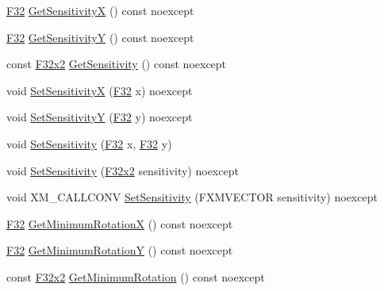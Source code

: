 \begin{DoxyCompactItemize}
\item 
\hyperlink{namespacemage_aa97e833b45f06d60a0a9c4fc22ae02c0}{F32} \hyperlink{classmage_1_1script_1_1_mouse_look_script_a86ee9593f0221bfa259f5ae5dd6edb30}{Get\+SensitivityX} () const noexcept
\item 
\hyperlink{namespacemage_aa97e833b45f06d60a0a9c4fc22ae02c0}{F32} \hyperlink{classmage_1_1script_1_1_mouse_look_script_a39303e2d535ecc610ac4ea2f23825452}{Get\+SensitivityY} () const noexcept
\item 
const \hyperlink{namespacemage_aa87237ad091f5cd7da612b8523fc108f}{F32x2} \hyperlink{classmage_1_1script_1_1_mouse_look_script_aba0ebcfb2085d74ee7d6b388d4b0b239}{Get\+Sensitivity} () const noexcept
\item 
void \hyperlink{classmage_1_1script_1_1_mouse_look_script_a97c2564df1660fb9d07f9a4269a77568}{Set\+SensitivityX} (\hyperlink{namespacemage_aa97e833b45f06d60a0a9c4fc22ae02c0}{F32} x) noexcept
\item 
void \hyperlink{classmage_1_1script_1_1_mouse_look_script_a95376c27d55cf12d557427b68ccbd802}{Set\+SensitivityY} (\hyperlink{namespacemage_aa97e833b45f06d60a0a9c4fc22ae02c0}{F32} y) noexcept
\item 
void \hyperlink{classmage_1_1script_1_1_mouse_look_script_a6116637b42e58b8f40de86ed47b54fe3}{Set\+Sensitivity} (\hyperlink{namespacemage_aa97e833b45f06d60a0a9c4fc22ae02c0}{F32} x, \hyperlink{namespacemage_aa97e833b45f06d60a0a9c4fc22ae02c0}{F32} y)
\item 
void \hyperlink{classmage_1_1script_1_1_mouse_look_script_adf611a4d9240e6cf338b665a2713cd9f}{Set\+Sensitivity} (\hyperlink{namespacemage_aa87237ad091f5cd7da612b8523fc108f}{F32x2} sensitivity) noexcept
\item 
void X\+M\+\_\+\+C\+A\+L\+L\+C\+O\+NV \hyperlink{classmage_1_1script_1_1_mouse_look_script_a784937d1254fe26ee28864d11956cd80}{Set\+Sensitivity} (F\+X\+M\+V\+E\+C\+T\+OR sensitivity) noexcept
\item 
\hyperlink{namespacemage_aa97e833b45f06d60a0a9c4fc22ae02c0}{F32} \hyperlink{classmage_1_1script_1_1_mouse_look_script_ae594a42302f9ccd47e08070759c3ccf7}{Get\+Minimum\+RotationX} () const noexcept
\item 
\hyperlink{namespacemage_aa97e833b45f06d60a0a9c4fc22ae02c0}{F32} \hyperlink{classmage_1_1script_1_1_mouse_look_script_a8faf82867207fb604f7155b8dbadfdb0}{Get\+Minimum\+RotationY} () const noexcept
\item 
const \hyperlink{namespacemage_aa87237ad091f5cd7da612b8523fc108f}{F32x2} \hyperlink{classmage_1_1script_1_1_mouse_look_script_a09e7e193cf2f5dca3342a130268a7a67}{Get\+Minimum\+Rotation} () const noexcept

\end{DoxyCompactItemize}
